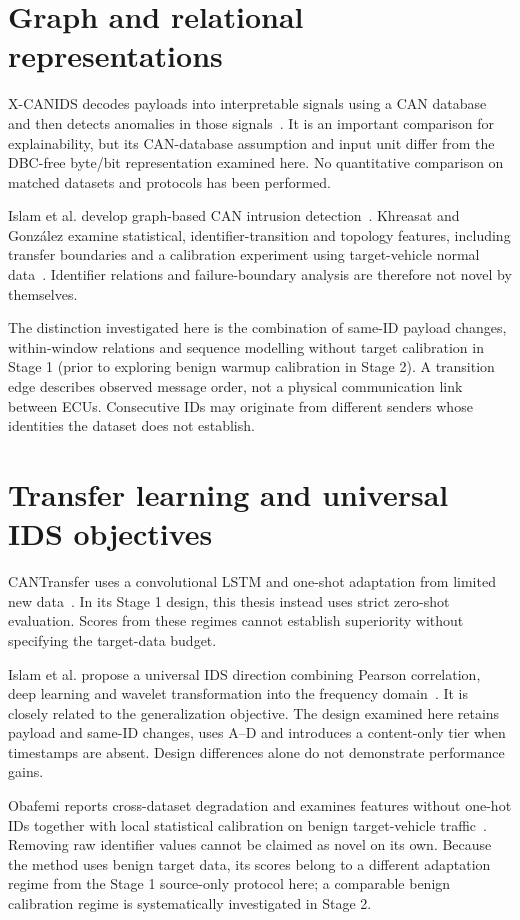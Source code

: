 \documentclass[12pt, a4paper, reqno, oneside]{book}
\begin{document}
\section{Graph and relational representations}
X-CANIDS decodes payloads into interpretable signals using a CAN database and then detects anomalies in those signals~\cite{jeong2024xcanids}. It is an important comparison for explainability, but its CAN-database assumption and input unit differ from the DBC-free byte/bit representation examined here. No quantitative comparison on matched datasets and protocols has been performed.

Islam et al. develop graph-based CAN intrusion detection~\cite{islam2020graph}. Khreasat and González examine statistical, identifier-transition and topology features, including transfer boundaries and a calibration experiment using target-vehicle normal data~\cite{khreasat2026relational}. Identifier relations and failure-boundary analysis are therefore not novel by themselves.

The distinction investigated here is the combination of same-ID payload changes, within-window relations and sequence modelling without target calibration in Stage 1 (prior to exploring benign warmup calibration in Stage 2). A transition edge describes observed message order, not a physical communication link between ECUs. Consecutive IDs may originate from different senders whose identities the dataset does not establish.

\section{Transfer learning and universal IDS objectives}
CANTransfer uses a convolutional LSTM and one-shot adaptation from limited new data~\cite{tariq2020cantransfer}. In its Stage 1 design, this thesis instead uses strict zero-shot evaluation. Scores from these regimes cannot establish superiority without specifying the target-data budget.

Islam et al. propose a universal IDS direction combining Pearson correlation, deep learning and wavelet transformation into the frequency domain~\cite{s26051489}. It is closely related to the generalization objective. The design examined here retains payload and same-ID changes, uses A--D and introduces a content-only tier when timestamps are absent. Design differences alone do not demonstrate performance gains.

Obafemi reports cross-dataset degradation and examines features without one-hot IDs together with local statistical calibration on benign target-vehicle traffic~\cite{obafemi2026travel}. Removing raw identifier values cannot be claimed as novel on its own. Because the method uses benign target data, its scores belong to a different adaptation regime from the Stage 1 source-only protocol here; a comparable benign calibration regime is systematically investigated in Stage 2.
\end{document}
